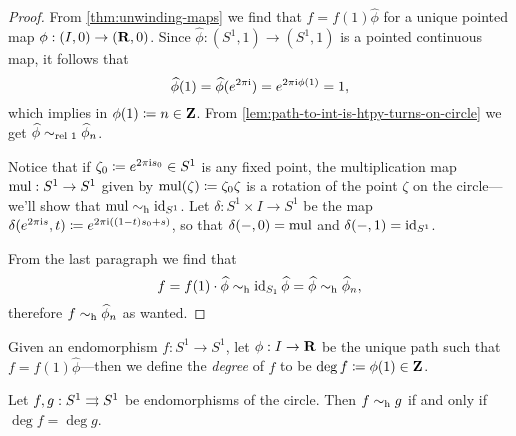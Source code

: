 \begin{proof}
From \cref{thm:unwinding-maps} we find that \(f = f(1) \widehat \phi\) for a
unique pointed map \(\phi: (I, 0) \to (\mathbf{R}, 0)\). Since
\(\widehat \phi: (S^1, 1) \to (S^1, 1)\) is a pointed continuous map, it follows
that
\[
\widehat\phi(1) = \widehat \phi(e^{2 \pi \text{i}}) = e^{2 \pi \text{i} \phi(1)} = 1,
\]
which implies in \(\phi(1) \coloneq n \in \mathbf{Z}\). From
\cref{lem:path-to-int-is-htpy-turns-on-circle} we get
\(\widehat \phi \sim_{\text{rel }{1}} \widehat \phi_n\).

Notice that if \(\zeta_0 \coloneq e^{2\pi \text{i} s_0} \in S^1\) is any fixed
point, the multiplication map \(\operatorname{mul}: S^1 \to S^1\) given by
\(\operatorname{mul}(\zeta) \coloneq \zeta_0 \zeta\) is a rotation of the point \(\zeta\) on
the circle---we'll show that \(\operatorname{mul} \sim_{\text{h}} \operatorname{id}_{S^1}\). Let
\(\delta: S^1 \times I \to S^1\) be the map
\(\delta(e^{2 \pi \text{i} s}, t) \coloneq e^{2 \pi \text{i} ((1 - t) s_0 + s)}\), so
that \(\delta(-, 0) = \operatorname{mul}\) and \(\delta(-, 1) = \operatorname{id}_{S^1}\).

From the last paragraph we find that
\[
f = f(1) \cdot \widehat \phi
\sim_{\text{h}} \operatorname{id}_{S_1} \widehat \phi
= \widehat \phi
\sim_{\text{h}} \widehat \phi_n,
\]
therefore \(f \sim_{\text{h}} \widehat \phi_n\) as wanted.
\end{proof}

\begin{definition}[Degree]
\label{def:degree-S1-map}
Given an endomorphism \(f: S^1 \to S^1\), let \(\phi: I \to \mathbf{R}\) be the unique
path such that \(f = f(1) \widehat \phi\)---then we define the \emph{degree} of
\(f\) to be \(\deg f \coloneq \phi(1) \in \mathbf{Z}\).
\end{definition}

\begin{lemma}
\label{lem:homotopic-S1-maps-have-equal-degree}
Let \(f, g: S^1 \rightrightarrows S^1\) be endomorphisms of the circle. Then \(f \sim_{\text{h}} g\)
if and only if \(\deg f = \deg g\).
\end{lemma}

